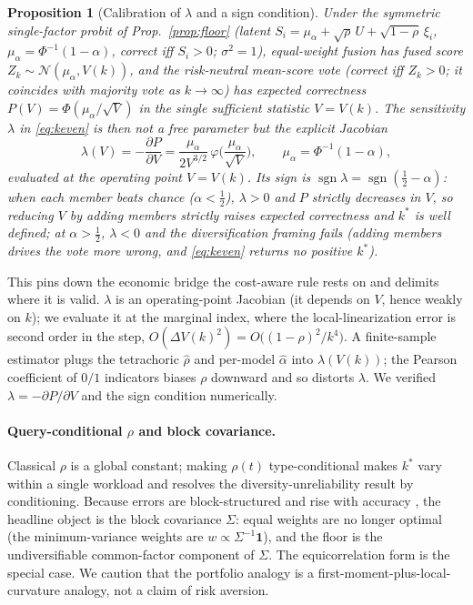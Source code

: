 \documentclass[11pt]{article}
\theoremstyle{plain}
\newtheorem{proposition}{Proposition}
\theoremstyle{definition}
\begin{document}
\begin{proposition}[Calibration of $\lambda$ and a sign condition]\label{prop:lambda}
Under the symmetric single-factor probit of Prop.~\ref{prop:floor} (latent $S_i=\mu_\alpha+\sqrt\rho\,U+\sqrt{1-\rho}\,\xi_i$,
$\mu_\alpha=\Phi^{-1}(1-\alpha)$, correct iff $S_i>0$; $\sigma^2=1$), equal-weight fusion has fused score $Z_k\sim\mathcal N(\mu_\alpha,V(k))$, and the
risk-neutral mean-score vote (correct iff $Z_k>0$; it coincides with majority vote as $k\to\infty$) has expected correctness
$P(V)=\Phi(\mu_\alpha/\sqrt V)$ in the single sufficient statistic $V=V(k)$. The sensitivity $\lambda$ in \eqref{eq:keven} is then
not a free parameter but the explicit Jacobian
\[ \lambda(V)=-\frac{\partial P}{\partial V}=\frac{\mu_\alpha}{2V^{3/2}}\,\varphi\!\Big(\frac{\mu_\alpha}{\sqrt V}\Big),\qquad \mu_\alpha=\Phi^{-1}(1-\alpha), \]
evaluated at the operating point $V=V(k)$. Its sign is $\operatorname{sgn}\lambda=\operatorname{sgn}(\tfrac12-\alpha)$: when
each member beats chance ($\alpha<\tfrac12$), $\lambda>0$ and $P$ strictly decreases in $V$, so reducing $V$ by adding members
strictly raises expected correctness and $k^\ast$ is well defined; at $\alpha>\tfrac12$, $\lambda<0$ and the diversification
framing fails (adding members drives the vote \emph{more} wrong, and \eqref{eq:keven} returns no positive $k^\ast$).
\end{proposition}
\noindent This pins down the economic bridge the cost-aware rule rests on and delimits where it is valid. $\lambda$ is an
operating-point Jacobian (it depends on $V$, hence weakly on $k$); we evaluate it at the marginal index, where the
local-linearization error is second order in the step, $O(\Delta V(k)^2)=O\big((1-\rho)^2/k^4\big)$. A finite-sample estimator plugs the tetrachoric $\hat\rho$ and per-model
$\hat\alpha$ into $\lambda(V(k))$; the Pearson coefficient of $0/1$ indicators biases $\rho$ downward and so distorts $\lambda$. We
verified $\lambda=-\partial P/\partial V$ and the sign condition numerically.

\paragraph{Query-conditional $\rho$ and block covariance.} Classical $\rho$ is a global constant; making $\rho(t)$
type-conditional makes $k^\ast$ vary within a single workload and resolves the diversity-unreliability result
\citep{kuncheva2003} by conditioning. Because errors are block-structured and rise with accuracy \citep{kim2025correlated},
the headline object is the block covariance $\Sigma$: equal weights are no longer optimal (the minimum-variance weights are
$w\propto\Sigma^{-1}\mathbf 1$), and the floor is the undiversifiable common-factor component of $\Sigma$. The equicorrelation
form is the special case. We caution that the portfolio analogy is a first-moment-plus-local-curvature analogy, not a claim of
risk aversion.
\end{document}
